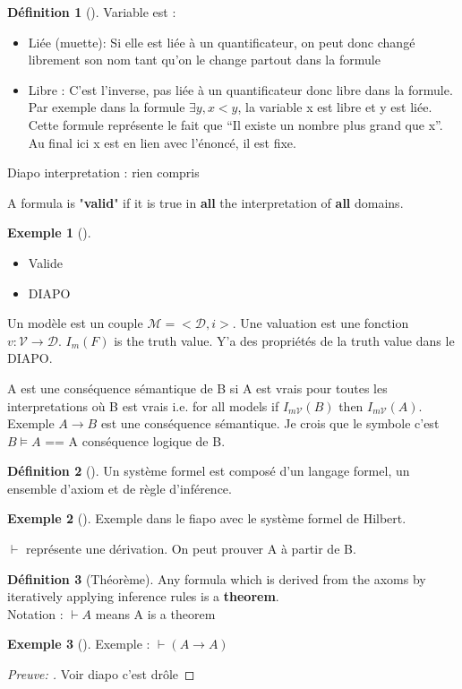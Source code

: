 \documentclass{article}
\theoremstyle{plain}%
\theoremstyle{definition}
\newtheorem{defn}{Définition}[section]
\newtheorem{exmp}{Exemple}[section]
\theoremstyle{remark}
\begin{document}
\begin{defn}[]
    Variable est : \begin{itemize}
        \item Liée (muette): Si elle est liée à un quantificateur, on peut donc changé librement son nom tant qu'on le change partout dans la formule
        \item Libre : C'est l'inverse, pas liée à un quantificateur donc libre dans la formule. Par exemple dans la formule $ \exists y, x<y $, la variable x est libre et y est liée. Cette formule représente le fait que “Il existe un nombre plus grand que x”. Au final ici x est en lien avec l'énoncé, il est fixe.
    \end{itemize}

    Diapo interpretation : rien compris

    A formula is "\textbf{valid}" if it is true in \textbf{all} the interpretation of \textbf{all} domains.
    \begin{exmp}[]
        \begin{itemize}
            \item Valide 
            \item DIAPO
        \end{itemize}
    \end{exmp}
    
    Un modèle est un couple $ \mathcal{M} = < \mathcal{D},i> $. Une valuation est une fonction $ v:\mathcal{V} \rightarrow  \mathcal{D} $. $ I_m(F) $ is the truth value. Y'a des propriétés de la truth value dans le DIAPO.

    A est une conséquence sémantique de B si A est vrais pour toutes les interpretations où B est vrais i.e. for all models if $ I_{m \mathcal{V}}(B) $ then $ I_{m \mathcal{V}}(A) $. Exemple $ A \rightarrow B $  est une conséquence sémantique. Je crois que le symbole c'est $ B \models A $ == A conséquence logique de B. 
\end{defn}

\begin{defn}[]
    Un système formel est composé d'un langage formel, un ensemble d'axiom et de règle d'inférence.

    \begin{exmp}[]
        Exemple dans le fiapo avec le système formel de Hilbert. 

        $ \vdash  $ représente une dérivation. On peut prouver A à partir de B.
    \end{exmp}
\end{defn}

\begin{defn}[Théorème]
    Any formula which is derived from the axoms by iteratively applying inference rules is a \textbf{theorem}.\\
    Notation : $ \vdash A $ means A is a theorem \\
    \begin{exmp}[]
        Exemple : $ \vdash (A \rightarrow A) $ 
        \begin{proof}[Preuve: ]
            Voir diapo c'est drôle
        \end{proof}
    \end{exmp}
\end{defn}
\end{document}
